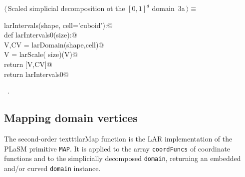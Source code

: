 \documentclass[11pt,oneside]{article}	%
\begin{document}
\begin{flushleft} \small \label{scrap2}
\protect{}$\langle\,$Scaled simplicial decomposition ot the $[0,1]^d$ domain\nobreak\ {\footnotesize 3a}$\,\rangle\equiv$
\vspace{-1ex}
\begin{list}{}{} \item
\mbox{}\verb@def larIntervals(shape, cell='cuboid'):@\\
\mbox{}\verb@   def larIntervals0(size):@\\
\mbox{}\verb@      V,CV = larDomain(shape,cell)@\\
\mbox{}\verb@      V = larScale( size)(V)@\\
\mbox{}\verb@      return [V,CV]@\\
\mbox{}\verb@   return larIntervals0@\\
\mbox{}\verb@@{\NWsep}
\end{list}
\vspace{-1ex}
\footnotesize\addtolength{\baselineskip}{-1ex}
\begin{list}{}{\setlength{\itemsep}{-\parsep}\setlength{\itemindent}{-\leftmargin}}
\item \NWtxtMacroRefIn\ .
\end{list}
\end{flushleft}

\subsection{Mapping domain vertices}
The second-order texttt{larMap} function is the LAR implementation of the PLaSM primitive \texttt{MAP}.
It is applied to the array \texttt{coordFuncs} of coordinate functions and to the simplicially decomposed  \texttt{domain}, returning an embedded and/or curved \texttt{domain} instance.
\end{document}
